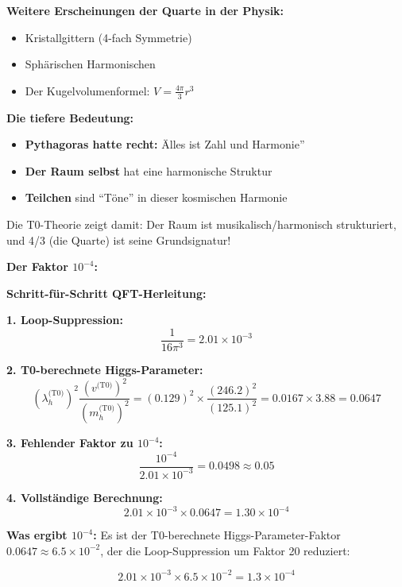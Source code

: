 \textbf{Weitere Erscheinungen der Quarte in der Physik:}
\begin{itemize}
	\item Kristallgittern (4-fach Symmetrie)
	\item Sphärischen Harmonischen
	\item Der Kugelvolumenformel: $V = \frac{4\pi}{3}r^3$
\end{itemize}

\textbf{Die tiefere Bedeutung:}
\begin{itemize}
	\item \textbf{Pythagoras hatte recht:} Älles ist Zahl und Harmonie''
	\item \textbf{Der Raum selbst} hat eine harmonische Struktur
	\item \textbf{Teilchen} sind ``Töne'' in dieser kosmischen Harmonie
\end{itemize}

Die T0-Theorie zeigt damit: Der Raum ist musikalisch/harmonisch strukturiert, und 4/3 (die Quarte) ist seine Grundsignatur!

\textbf{Der Faktor $10^{-4}$:}

\textbf{Schritt-für-Schritt QFT-Herleitung:}

\textbf{1. Loop-Suppression:}
\begin{equation}
	\frac{1}{16\pi^3} = 2.01 \times 10^{-3}
\end{equation}

\textbf{2. T0-berechnete Higgs-Parameter:}
\begin{equation}
	(\lambda_h^{\text{(T0)}})^2 \frac{(v^{\text{(T0)}})^2}{(m_h^{\text{(T0)}})^2} = (0.129)^2 \times \frac{(246.2)^2}{(125.1)^2} = 0.0167 \times 3.88 = 0.0647
\end{equation}

\textbf{3. Fehlender Faktor zu $10^{-4}$:}
\begin{equation}
	\frac{10^{-4}}{2.01 \times 10^{-3}} = 0.0498 \approx 0.05
\end{equation}

\textbf{4. Vollständige Berechnung:}
\begin{equation}
	2.01 \times 10^{-3} \times 0.0647 = 1.30 \times 10^{-4}
\end{equation}

\textbf{Was ergibt $10^{-4}$:}
Es ist der T0-berechnete Higgs-Parameter-Faktor $0.0647 \approx 6.5 \times 10^{-2}$, der die Loop-Suppression um Faktor 20 reduziert:

\begin{equation}
	2.01 \times 10^{-3} \times 6.5 \times 10^{-2} = 1.3 \times 10^{-4}
\end{equation}

